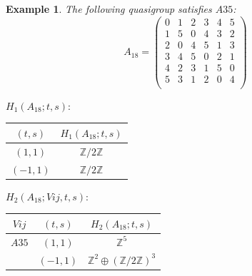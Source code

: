 \documentclass[11pt]{amsart}
\newtheorem{example}[theorem]{Example}
\theoremstyle{definition}
\newcommand{\Z}{\mathbb{Z}}
\begin{document}
\begin{example}
The following quasigroup satisfies 
$A35$:
   \[ A_{18} = \left(
\begin{array}{cccccc}
 0 & 1 & 2 & 3 & 4 & 5 \\
 1 & 5 & 0 & 4 & 3 & 2 \\
 2 & 0 & 4 & 5 & 1 & 3 \\
 3 & 4 & 5 & 0 & 2 & 1 \\
 4 & 2 & 3 & 1 & 5 & 0 \\
 5 & 3 & 1 & 2 & 0 & 4 \\
\end{array}
\right)\]


\bigskip


$H_1(A_{18};t,s):$

\begin{center}
    
\begin{tabular}{c|c}
    $(t,s)$ & $H_1(A_{18};t,s)$  \\
    \hline
    $(1,1)$ & $\Z/2\Z$ \\
    $(-1,1)$ & $\Z/2\Z$ \\
\end{tabular}
\end{center}
\bigskip

$H_2(A_{18};Vij,t,s):$

\begin{center}
    
\begin{tabular}{c|c|c}
    $Vij$ & $(t,s)$ & $H_2(A_{18};t,s)$  \\
    \hline

    $A35$ & $(1,1)$ & $\Z^5$ \\
        & $(-1,1)$ & $\Z^2 \oplus (\Z/2\Z)^3$ \\
    \end{tabular}

\end{center}

\end{example}
\end{document}
